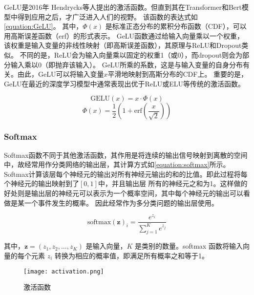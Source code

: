   GeLU是2016年 Hendrycks等人提出的激活函数\cite{2016GeLU}。但直到其在Transformer和Bert模型中得到应用之后，才广泛进入人们的视野。
  该函数的表达式如\cref{equation:GeLU}。
  其中，$\Phi(x)$ 是标准正态分布的累积分布函数（CDF），可以用高斯误差函数（erf）的形式表示。
  GeLU函数通过给输入向量乘以一个权重，该权重是输入变量的非线性映射（即高斯误差函数），其原理与ReLU和Dropout类似。
  不同的是，ReLU会为输入向量乘以固定的权重1（或0），而dropout则会为部分输入乘以0（即抛弃该输入）。
  GeLU所乘的系数，这是与输入变量的自身分布有关。由此，GeLU可以将输入变量$x$平滑地映射到高斯分布的CDF上。
  重要的是，GeLU在最近的深度学习模型中通常表现出优于ReLU或ELU等传统的激活函数。

  \begin{equation}
    \label{equation:GeLU}
    \text{GELU}(x) = x \cdot \Phi(x) 
  \end{equation}
   \begin{equation}
    \label{equation:Gauss}
    \Phi(x) = \frac{1}{2} \left(1 + \text{erf} \left(\frac{x}{\sqrt{2}}\right)\right)
  \end{equation}
  

  \subsubsection{Softmax}

  Softmax函数不同于其他激活函数，其作用是将连续的输出信号映射到离散的空间中，故经常用作分类网络的输出层，其计算方式如\cref{equation:softmax}所示。
  Softmax计算该层每个神经元的输出对所有神经元输出的和的比值。即此过程将每个神经元的输出映射到了$[0,1]$中，并且输出层
  所有的神经元之和为1。这样做的好处则是输出层的神经元可以表示为一个概率空间，其中每个神经元的输出可以看做是某一个事件发生的概率。
  因此经常作为多分类问题的输出层使用。

\begin{equation}
  \label{equation:softmax}
  \text{softmax}(\mathbf{z})_i = \frac{e^{z_i}}{\sum_{j=1}^{K} e^{z_j}}
\end{equation}

其中，$\mathbf{z} = (z_1, z_2, ..., z_K)$ 是输入向量，$K$ 是类别的数量。softmax 函数将输入向量的每个元素 $z_i$ 转换为相应的概率值，即满足所有概率之和等于1。



\begin{figure}[h]
  \centering
\texttt{[image: activation.png]}
\caption{激活函数}
\label{figure:activation}
  
\end{figure}

